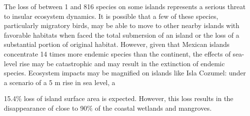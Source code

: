 \documentclass{article} %
\begin{document}
The loss of between 1 and 816 species on some islands represents a serious threat
to insular ecosystem dynamics. It is possible that a few of these species, particularly
migratory birds, may be able to move to other nearby islands with favorable habitats
when faced the total submersion of an island or the loss of a substantial portion of
original habitat. However, given that Mexican islands concentrate 14 times more
endemic species than the continent, the effects of sea-level rise may be catastrophic
and may result in the extinction of endemic species. Ecosystem impacts may be
magnified on islands like Isla Cozumel: under a scenario of a 5 m rise in sea level, a

15.4\% loss of island surface area is expected. However, this loss results in the
disappearance of close to 90\% of the coastal wetlands and mangroves.\\
\end{document}
